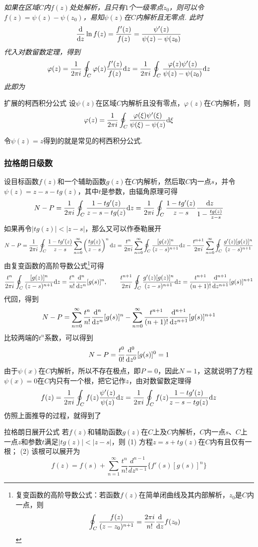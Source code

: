 \documentclass[main.tex]{subfiles}
\begin{document}
\textit{
如果在区域\(C\)内\(f(z)\)处处解析，且只有\(1\)个一级零点\(z_0\)，则可以令\(f(z)=\psi(z)-\psi(z_0)\)，易知\(\psi(z)\)在\(C\)内解析且无零点. 此时
\[\frac{{\rm d}}{{\rm d}z}\ln f(z) = \frac{f'(z)}{f(z)}=\frac{\psi'(z)}{\psi(z)-\psi(z_0)}\]
代入对数留数定理，得到
\[\varphi(z) = \frac{1}{2\pi i}\oint_C \varphi(z)\frac{f'(z)}{f(z)}{\rm d}z = \frac{1}{2\pi i}\oint_C\frac{\varphi(z)\psi'(z)}{\psi(z)-\psi(z_0)}{\rm d}z\]
此即为
}
\begin{theorem}{扩展的柯西积分公式}
    设\(\psi(z)\)在区域\(C\)内解析且没有零点，\(\varphi(z)\)在\(C\)内解析，则
    \[\varphi(z)=\frac{1}{2 \pi i}\oint_C\frac{\varphi(\xi)\psi'(\xi)}{\psi(\xi)-\psi(z)}{\rm d}\xi\]
\end{theorem}
令\(\psi(z)=z\)得到的就是常见的柯西积分公式.

\subsubsection{拉格朗日级数}

设目标函数\(f(z)\)和一个辅助函数\(g(z)\)在\(C\)内解析，然后取\(C\)内一点\(s\)，并令\(\psi(z) = z-s-tg(z)\)，其中\(t\)是参数，由辐角原理可得
\[N-P=\frac{1}{2\pi i}\oint_{C}\frac{1-tg'(z)}{z-s-tg(z)}{\rm d}z = \frac{1}{2\pi i}\oint_{C}\frac{1-tg'(z)}{z-s}\frac{{\rm d}z}{1-\frac{tg(z)}{z-s}}\]
如果再令\(|tg(z)|<|z-s|\)，那么又可以作泰勒展开
\[N-P = \frac{1}{2\pi i}\oint_{C}\frac{1-tg'(z)}{z-s}\sum_{n=0}^{\infty}\left(\frac{tg(z)}{z-s}\right)^n{\rm d}z = \frac{t^n}{2\pi i}\sum_{n=0}^{\infty}\oint_{C}\frac{[g(z)]^n}{(z-s)^{n+1}}{\rm d}z-\frac{t^{n+1}}{2 \pi i}\sum_{n=0}^{\infty}\oint_{C}\frac{g'(z)[g(z)]^{n}}{(z-s)^{n+1}}\]
由复变函数的高阶导数公式\footnote{复变函数的高阶导数公式：若函数\(f(z)\)在简单闭曲线及其内部解析，\(z_0\)是\(C\)内一点，则\[\oint_C \frac{f(z)}{(z-z_0)^{n+1}} = \frac{2\pi i}{n!}\dfrac{{\rm d}}{{\rm d}z}f(z_0)\]}可得
\[\frac{t^n}{2\pi i}\oint_{C}\frac{[g(z)]^n}{(z-s)^{n+1}}{\rm d}z = \frac{t^{n}}{n!}\frac{{\rm d}^n}{{\rm d}z^n}[g(s)]^{n}, \qquad \frac{t^{n+1}}{2\pi i}\oint_{C}\frac{g'(z)[g(z)]^n}{(z-s)^{n+1}}{\rm d}z = \frac{t^{n+1}}{(n+1)!}\frac{{\rm d}^{n+1}}{{\rm d}z^{n+1}}[g(s)]^{n+1}\]
代回，得到
\[N-P=\sum_{n=0}^{\infty}\frac{t^{n}}{n!}\frac{{\rm d}^n}{{\rm d}z^n}[g(s)]^{n}-\sum_{n=0}^{\infty}\frac{t^{n+1}}{(n+1)!}\frac{{\rm d}^{n+1}}{{\rm d}z^{n+1}}[g(s)]^{n+1}\]
比较两端的\(t^n\)系数，可以得到
\[N-P=\frac{t^{0}}{0!}\frac{{\rm d}^0}{{\rm d}z^0}[g(s)]^{0}=1\]
由于\(\psi(x)\)在\(C\)内解析，所以不存在极点，即\(P=0\)，因此\(N=1\)，这就说明了方程\(\psi(x)=0\)在\(C\)内只有一个根，把它记作\(z\)，由对数留数定理得
\[f(z)=\frac{1}{2\pi i}\oint_{C}f(z)\frac{\psi'(z)}{\psi(z)}{\rm d}z = \frac{1}{2\pi i}\oint_{C}f(z)\frac{1-tg'(z)}{z-s-tg(z)}{\rm d}z\]
仿照上面推导的过程，就得到了
\begin{theorem}{拉格朗日展开公式}
    若\(f(z)\)和辅助函数\(g(z)\)在\(C\)上及\(C\)内解析，\(C\)内一点\(s\)、\(C\)上一点\(z\)和参数\(t\)满足\(|tg(z)|<|z-s|\)，则\newline
    (1) 方程\(z=s+tg(z)\)在\(C\)内有且仅有一根；\newline
    (2) 该根可以展开为
    \[f(z) = f(s)+\sum_{n=1}^{\infty}\frac{t^n}{n!}\frac{d^{n-1}}{dz^{n-1}}\{f'(s)[g(s)]^n\}\]
\end{theorem}
\end{document}
